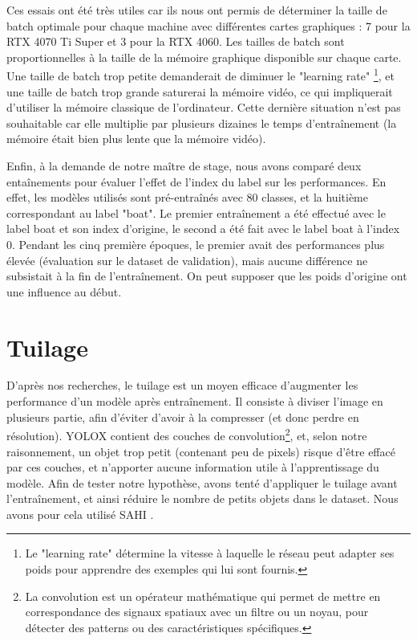 Ces essais ont été très utiles car ils nous ont permis de déterminer la taille de batch
optimale \cite{Goodfellow-et-al-2016} pour chaque machine avec différentes cartes graphiques :
7 pour la RTX 4070 Ti Super et 3 pour la RTX 4060.
Les tailles de batch sont proportionnelles à la taille de la mémoire graphique
disponible sur chaque carte. Une taille de batch trop petite demanderait de diminuer le "learning rate"
\footnote{Le "learning rate" détermine la vitesse à laquelle le réseau peut adapter ses poids
pour apprendre des exemples qui lui sont fournis.}, et une taille de batch trop grande
saturerai la mémoire vidéo, ce qui impliquerait d'utiliser la mémoire classique de l'ordinateur.
Cette dernière situation n'est pas souhaitable car elle multiplie par plusieurs dizaines
le temps d'entraînement (la mémoire était bien plus lente que la mémoire vidéo).

Enfin, à la demande de notre maître de stage, nous avons comparé deux entaînements pour évaluer
l'effet de l'index du label sur les performances.
En effet, les modèles utilisés sont pré-entraînés avec 80 classes, et la huitième correspondant
au label "boat". Le premier entraînement a été effectué avec le label boat et son index d'origine,
le second a été fait avec le label boat à l'index 0.
Pendant les cinq première époques, le premier avait des performances plus élevée (évaluation sur
le dataset de validation), mais aucune différence ne subsistait à la fin de l'entraînement.
On peut supposer que les poids d'origine ont une influence au début.


\section{Tuilage}

D'après nos recherches, le tuilage est un moyen efficace d'augmenter les performance d'un modèle après
entraînement. Il consiste à diviser l'image en plusieurs partie, afin d'éviter d'avoir à la compresser
(et donc perdre en résolution).
YOLOX contient des couches de convolution\footnote{La convolution est un opérateur mathématique
qui permet de mettre en correspondance des signaux spatiaux avec un filtre ou un noyau,
pour détecter des patterns ou des caractéristiques spécifiques.}, et, selon notre raisonnement,
un objet trop petit (contenant peu de pixels) risque d'être effacé par ces couches, et n'apporter
aucune information utile à l'apprentissage du modèle.
Afin de tester notre hypothèse, avons tenté d'appliquer le tuilage avant l'entraînement,
et ainsi réduire le nombre de petits objets dans le dataset.
Nous avons pour cela utilisé SAHI \cite{Akyon_Altinuc_Temizel_2022}.

